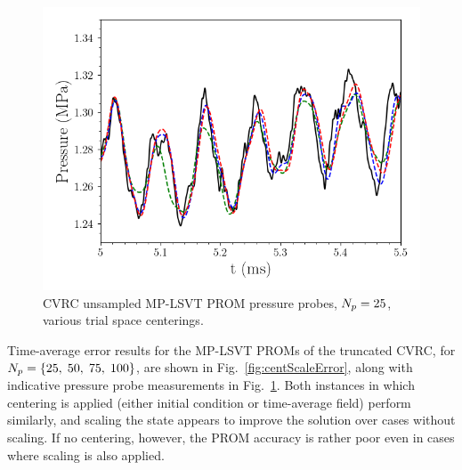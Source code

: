 \begin{figure}
	\centering
	\begin{minipage}{0.49\linewidth}
		\includegraphics[width=0.99\linewidth]{Chapters/BestPractices/Images/pressure_probe_centScale_centMean.png}
	\end{minipage}
	\caption{\label{fig:centScaleProbes}CVRC unsampled MP-LSVT PROM pressure probes, $N_p = 25$, various trial space centerings.}
\end{figure}

Time-average error results for the MP-LSVT PROMs of the truncated CVRC, for $N_p = \{25,\; 50,\; 75,\; 100\}$, are shown in Fig.~\ref{fig:centScaleError}, along with indicative pressure probe measurements in Fig.~\ref{fig:centScaleProbes}. Both instances in which centering is applied (either initial condition or time-average field) perform similarly, and scaling the state appears to improve the solution over cases without scaling. If no centering, however, the PROM accuracy is rather poor even in cases where scaling is also applied. 